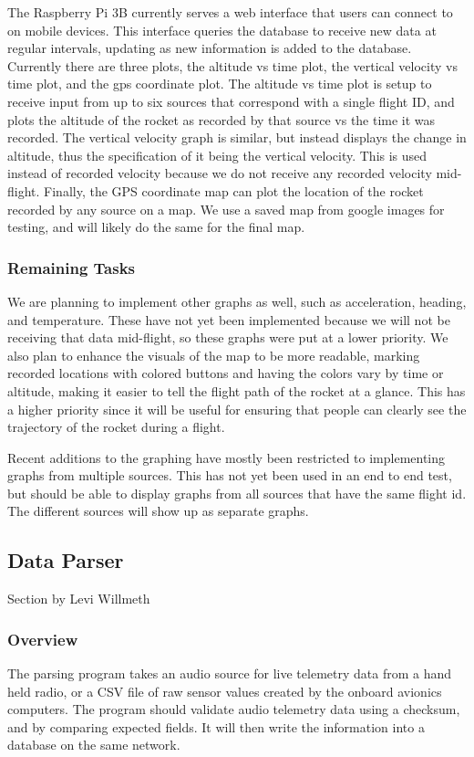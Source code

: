 \documentclass[onecolumn, draftclsnofoot, 10pt, compsoc]{IEEEtran}
\begin{document}
The Raspberry Pi 3B currently serves a web interface that users can connect to on mobile devices. This interface queries the database to receive new data at regular intervals, updating as new information is added to the database. Currently there are three plots, the altitude vs time plot, the vertical velocity vs time plot, and the gps coordinate plot. The altitude vs time plot is setup to receive input from up to six sources that correspond with a single flight ID, and plots the altitude of the rocket as recorded by that source vs the time it was recorded. The vertical velocity graph is similar, but instead displays the change in altitude, thus the specification of it being the vertical velocity. This is used instead of recorded velocity because we do not receive any recorded velocity mid-flight. Finally, the GPS coordinate map can plot the location of the rocket recorded by any source on a map. We use a saved map from google images for testing, and will likely do the same for the final map.

\subsubsection{Remaining Tasks}

We are planning to implement other graphs as well, such as acceleration, heading, and temperature. These have not yet been implemented because we will not be receiving that data mid-flight, so these graphs were put at a lower priority. We also plan to enhance the visuals of the map to be more readable, marking recorded locations with colored buttons and having the colors vary by time or altitude, making it easier to tell the flight path of the rocket at a glance. This has a higher priority since it will be useful for ensuring that people can clearly see the trajectory of the rocket during a flight.

Recent additions to the graphing have mostly been restricted to implementing graphs from multiple sources. This has not yet been used in an end to end test, but should be able to display graphs from all sources that have the same flight id. The different sources will show up as separate graphs. 


\subsection{Data Parser}
Section by Levi Willmeth
\subsubsection{Overview}
The parsing program takes an audio source for live telemetry data from a hand held radio, or a CSV file of raw sensor values created by the onboard avionics computers.  The program should validate audio telemetry data using a checksum, and by comparing expected fields.  It will then write the information into a database on the same network.
\end{document}
